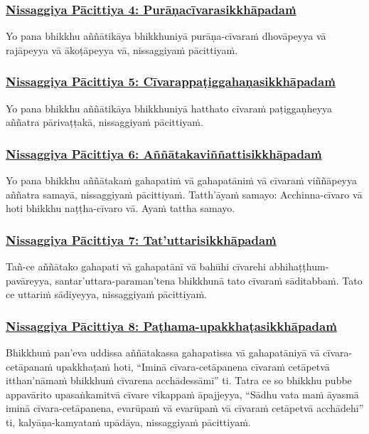 \subsubsection*{\hyperref[forf-exp4]{Nissaggiya Pācittiya 4: Purāṇacīvarasikkhāpadaṁ}}
\label{np4}

Yo pana bhikkhu aññātikāya bhikkhuniyā purāṇa-cīvaraṁ dhovāpeyya vā rajāpeyya vā ākoṭāpeyya vā, nissaggiyaṁ pācittiyaṁ.

\subsubsection*{\hyperref[forf-exp5]{Nissaggiya Pācittiya 5: Cīvarappaṭiggahaṇasikkhāpadaṁ}}
\label{np5}

Yo pana bhikkhu aññātikāya bhikkhuniyā hatthato cīvaraṁ paṭiggaṇheyya aññatra pārivaṭṭakā, nissaggiyaṁ pācittiyaṁ.

\subsubsection*{\hyperref[forf-exp6]{Nissaggiya Pācittiya 6: Aññātakaviññattisikkhāpadaṁ}}
\label{np6}

Yo pana bhikkhu aññātakaṁ gahapatiṁ vā gahapatāniṁ vā cīvaraṁ viññāpeyya aññatra samayā, nissaggiyaṁ pācittiyaṁ. Tatth’āyaṁ samayo: Acchinna-cīvaro vā hoti bhikkhu naṭṭha-cīvaro vā. Ayaṁ tattha samayo.

\subsubsection*{\hyperref[forf-exp7]{Nissaggiya Pācittiya 7: Tat'uttarisikkhāpadaṁ}}
\label{np7}

Tañ-ce aññātako gahapati vā gahapatānī vā bahūhi cīvarehi abhihaṭṭhum-pavāreyya, santar’uttara-paraman’tena bhikkhunā tato cīvaraṁ sāditabbaṁ. Tato ce uttariṁ sādiyeyya, nissaggiyaṁ pācittiyaṁ.

\subsubsection*{\hyperref[forf-exp8]{Nissaggiya Pācittiya 8: Paṭhama-upakkhaṭasikkhāpadaṁ}}
\label{np8}

Bhikkhuṁ pan’eva uddissa aññātakassa gahapatissa vā gahapatāniyā vā cīvara-cetāpanaṁ upakkhaṭaṁ hoti, “Iminā cīvara-cetāpanena cīvaraṁ cetāpetvā itthan'nāmaṁ bhikkhuṁ cīvarena acchādessāmī” ti. Tatra ce so bhikkhu pubbe appavārito upasaṅkamitvā cīvare vikappaṁ āpajjeyya, “Sādhu vata maṁ āyasmā iminā cīvara-cetāpanena, evarūpaṁ vā evarūpaṁ vā cīvaraṁ cetāpetvā acchādehī” ti, kalyāṇa-kamyataṁ upādāya, nissaggiyaṁ pācittiyaṁ.


